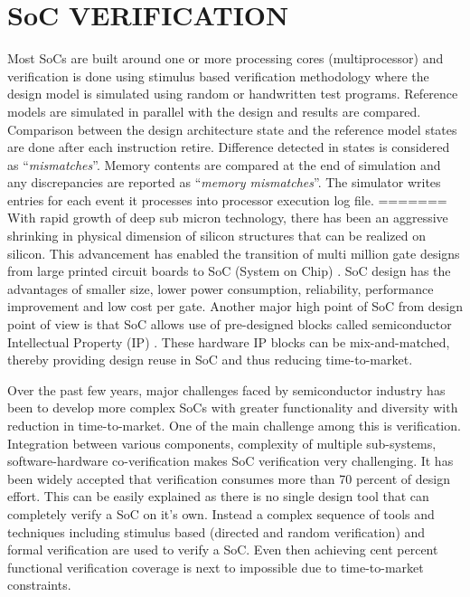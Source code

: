 \section{SoC VERIFICATION}
Most SoCs are built around one or more processing cores (multiprocessor) and verification is done using stimulus based verification methodology where the design model is simulated using random or handwritten test programs. Reference models are simulated in parallel with the design and results are compared. Comparison between the design architecture state and the reference model states are done after each instruction retire. Difference detected in states is considered as ``{\it mismatches}''. Memory contents are compared at the end of simulation and any discrepancies are reported as ``{\it memory mismatches}''. The simulator writes entries for each event it processes into processor execution log file.
=======
With rapid growth of deep sub micron technology, there has been an aggressive shrinking in physical dimension of silicon structures that can be realized on silicon. This advancement has enabled the transition of multi million gate designs from large printed circuit boards to SoC (System on Chip) . SoC design has the advantages of smaller size, lower power consumption, reliability, performance improvement and low cost per gate. Another major high point of SoC from design point of view is that SoC allows use of pre-designed blocks called semiconductor Intellectual Property (IP) . These hardware IP blocks can be mix-and-matched, thereby providing design reuse in SoC and thus reducing time-to-market\cite{ieee:SOC:2010}. 


 Over the past few years, major challenges faced by semiconductor industry has been to develop more complex SoCs with greater functionality and diversity with reduction in time-to-market. One of the main challenge among this is verification\cite{soc}. Integration between various components, complexity of multiple sub-systems, software-hardware co-verification makes SoC verification very challenging. It has been widely accepted that verification consumes more than 70 percent of design effort\cite{phd:zhang}. This can be easily explained as there is no single design tool that can completely verify a SoC on it's own. Instead a complex sequence of tools and techniques including stimulus based (directed and random verification) and formal verification are used to verify a SoC. Even then achieving cent percent functional verification coverage is next to impossible due to time-to-market constraints.


